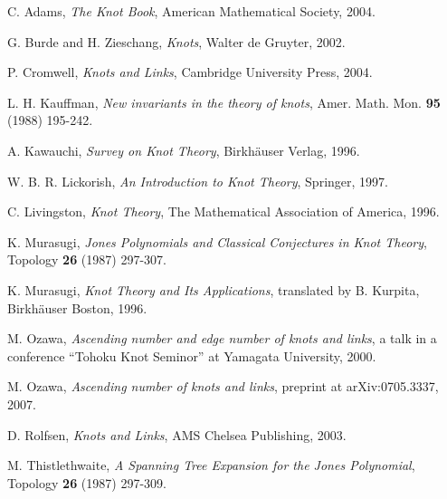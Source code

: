 \documentclass{amsart}
\theoremstyle{definition}
\theoremstyle{remark}
\numberwithin{equation}{section}
\begin{document}

\begin{thebibliography}{10}

 C. Adams, {\em The Knot Book}, American Mathematical Society, 2004.

 G. Burde and H. Zieschang, {\em Knots}, Walter de Gruyter, 2002.

 P. Cromwell, {\em Knots and Links}, Cambridge University Press, 2004.

 L. H. Kauffman, {\em New invariants in the theory of knots}, Amer. Math. Mon. {\bf 95} (1988) 195-242.

A. Kawauchi, {\em Survey on Knot Theory}, Birkh\"{a}user Verlag, 1996.

 W. B. R. Lickorish, {\em An Introduction to Knot Theory}, Springer, 1997.

 C. Livingston, {\em Knot Theory}, The Mathematical Association of America, 1996.

 K. Murasugi, {\em Jones Polynomials and Classical Conjectures in Knot Theory}, Topology {\bf 26} (1987) 297-307.

 K. Murasugi, {\em Knot Theory and Its Applications}, translated by B. Kurpita, Birkh\"{a}user Boston, 1996.

 M. Ozawa, {\em Ascending number and edge number of knots and links}, a talk in a conference ``Tohoku Knot Seminor'' at Yamagata University, 2000.

 M. Ozawa, {\em Ascending number of knots and links}, preprint at arXiv:0705.3337, 2007.

 D. Rolfsen, {\em Knots and Links}, AMS Chelsea Publishing, 2003.

 M. Thistlethwaite, {\em A Spanning Tree Expansion for the Jones Polynomial}, Topology {\bf 26} (1987) 297-309.

\end{thebibliography}
\end{document}

